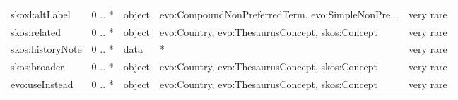 \documentclass[10pt,a4paper,titlepage,final]{article}
\begin{document}
\begin{tabularx}{\textwidth}{lllXr}
         skoxl:altLabel &      0 .. * &  object &  evo:CompoundNonPreferredTerm, evo:SimpleNonPre... &  very rare \\
           skos:related &      0 .. * &  object &    evo:Country, evo:ThesaurusConcept, skos:Concept &  very rare \\
       skos:historyNote &      0 .. * &    data &                                                  * &  very rare \\
           skos:broader &      0 .. * &  object &    evo:Country, evo:ThesaurusConcept, skos:Concept &  very rare \\
         evo:useInstead &      0 .. * &  object &    evo:Country, evo:ThesaurusConcept, skos:Concept &  very rare \\
\end{tabularx}
\end{document}
